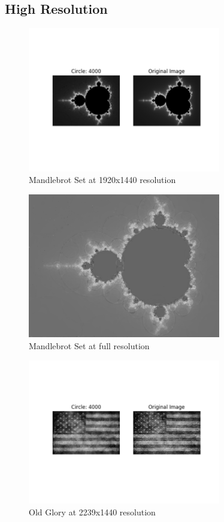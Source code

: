 \documentclass[12pt]{article}
\begin{document}
\newpage
\subsection*{High Resolution}
\begin{figure}[H]
\centering
\noindent\includegraphics[width=0.75\textwidth]{../results/mandlebrot/mandlebrot_4000}
\caption{Mandlebrot Set at 1920x1440 resolution}
\label{fig:mandlebrot}
\end{figure}

\begin{figure}[H]
\centering
\noindent\includegraphics[width=0.75\textwidth]{../results/mandlebrot/mandlebrot_raw_4000}
\caption{Mandlebrot Set at full resolution}
\label{fig:mandlebrot_raw}
\end{figure}

\begin{figure}[H]
\centering
\noindent\includegraphics[width=0.75\textwidth]{../results/old_glory/old_glory_4000}
\caption{Old Glory at 2239x1440 resolution}
\label{fig:old_glory}
\end{figure}
\end{document}
